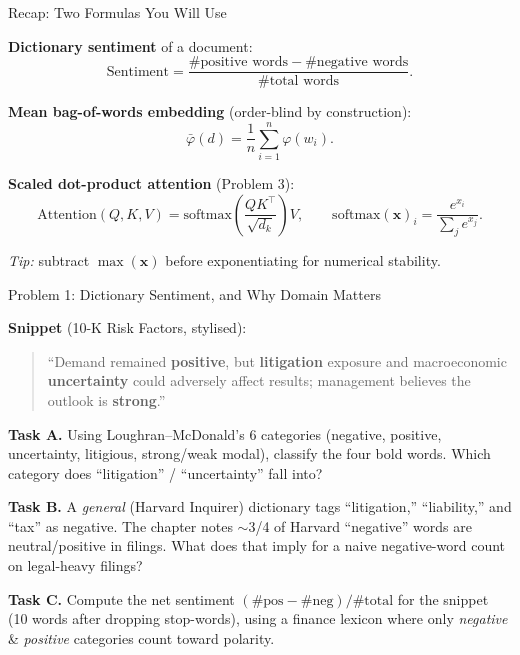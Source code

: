 \documentclass[9pt,t]{beamer}
\begin{document}
\begin{frame}{Recap: Two Formulas You Will Use}

\textbf{Dictionary sentiment} of a document:
\[
  \mathrm{Sentiment} = \frac{\#\text{positive words} - \#\text{negative words}}
                            {\#\text{total words}}.
\]

\medskip
\textbf{Mean bag-of-words embedding} (order-blind by construction):
\[
  \bar{\varphi}(d) = \frac{1}{n}\sum_{i=1}^{n}\varphi(w_i).
\]

\medskip
\textbf{Scaled dot-product attention} (Problem 3):
\[
  \mathrm{Attention}(Q,K,V) = \mathrm{softmax}\!\left(\frac{QK^\top}{\sqrt{d_k}}\right)V,
  \qquad
  \mathrm{softmax}(\mathbf{x})_i = \frac{e^{x_i}}{\sum_j e^{x_j}}.
\]

\medskip
\emph{Tip:} subtract $\max(\mathbf{x})$ before exponentiating for numerical stability.
\end{frame}

\begin{frame}{Problem 1: Dictionary Sentiment, and Why Domain Matters}

\textbf{Snippet} (10-K Risk Factors, stylised):
\begin{quote}\small
``Demand remained \textbf{positive}, but \textbf{litigation} exposure and
macroeconomic \textbf{uncertainty} could adversely affect results; management
believes the outlook is \textbf{strong}.''
\end{quote}

\medskip
\textbf{Task A.} Using Loughran--McDonald's 6 categories
(negative, positive, uncertainty, litigious, strong/weak modal), classify the
four bold words. Which category does ``litigation'' / ``uncertainty'' fall into?

\medskip
\textbf{Task B.} A \emph{general} (Harvard Inquirer) dictionary tags
``litigation,'' ``liability,'' and ``tax'' as negative. The chapter notes
$\sim$3/4 of Harvard ``negative'' words are neutral/positive in filings.
What does that imply for a naive negative-word count on legal-heavy filings?

\medskip
\textbf{Task C.} Compute the net sentiment $(\#\text{pos}-\#\text{neg})/\#\text{total}$
for the snippet (10 words after dropping stop-words), using a finance lexicon
where only \emph{negative} \& \emph{positive} categories count toward polarity.
\end{frame}
\end{document}
